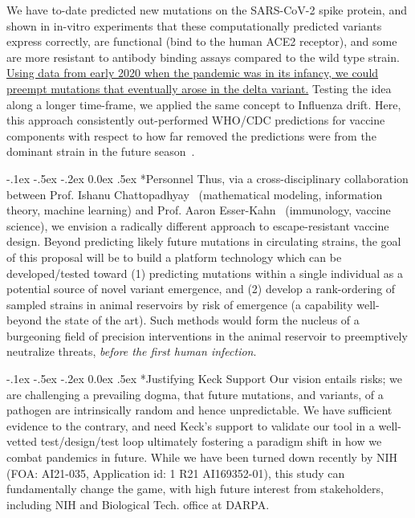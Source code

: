 \documentclass[onecolumn, compsoc,12pt]{IEEEtran}
\makeatletter
\renewcommand\paragraph{\@startsection {section}{1}{\z@}%
                                   {-.1ex \@plus -.5ex \@minus -.2ex}%
                                   {0.0ex \@plus.5ex}%
                                   {\fontsize{11}{10}\selectfont\bfseries\itshape\sffamily\color{black}}}
\def\hcov{SARS-CoV-2\xspace}
\makeatother
\begin{document}
We have to-date predicted new mutations on the \hcov spike protein, and shown in in-vitro experiments that these computationally predicted variants express correctly, are functional (bind to the human ACE2 receptor), and some are more resistant to antibody binding assays compared to the wild type strain. \uline{Using data from early 2020 when the pandemic was in its infancy, we could preempt mutations that eventually arose in the delta variant.} Testing the idea along a longer time-frame, we applied the same concept to Influenza drift. Here, this approach consistently out-performed WHO/CDC predictions for vaccine components with respect to how far removed the predictions were  from the dominant strain in the future season~\cite{Li2020.07.17.20156364}.

\paragraph*{Personnel} Thus, via a cross-disciplinary collaboration  between Prof. Ishanu Chattopadhyay~\cite{chattopadhyay2014data,chattopadhyay2018conjunction,huang2021universal,onishchenko2021reduced} (mathematical modeling, information theory, machine learning) and Prof. Aaron Esser-Kahn~\cite{onishchenko2021reduced,moser2019small,manna2020pathogen} (immunology, vaccine science), we envision a radically different approach to escape-resistant vaccine design. Beyond  predicting likely future mutations in circulating strains, the goal of this proposal will be to build a platform technology which can be developed/tested toward (1) predicting mutations within a single individual as a potential source of novel variant emergence, and (2) develop a rank-ordering of  sampled strains in animal reservoirs by  risk of emergence (a capability well-beyond the state of the art). Such methods would form the nucleus of a burgeoning field of precision  interventions  in the animal reservoir to preemptively neutralize threats,  \textit{before the first human infection}.

\paragraph*{Justifying Keck Support} Our vision   entails  risks;  we are challenging a prevailing dogma, that future mutations, and variants, of a pathogen are intrinsically random and hence unpredictable.  We have sufficient evidence to the contrary, and need Keck's support to validate our tool in a well-vetted test/design/test loop  ultimately fostering a paradigm shift in  how we combat pandemics in future. While we have been turned down recently by NIH (FOA: AI21-035, Application id: 1 R21 AI169352-01), this study can fundamentally change the game, with high future interest from stakeholders, including NIH and Biological Tech. office at DARPA.
\end{document}
